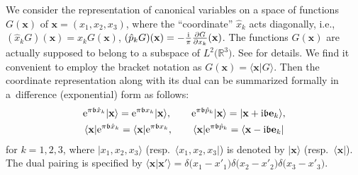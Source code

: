 \documentclass[pdftex]{sigma}
\newcommand{\R}{{\mathbb R}}
\newcommand{\bb}{{\mathfrak b}}
\newcommand{\e}{{\mathrm e}}
\numberwithin{equation}{section}
\begin{document}
We consider the representation of canonical variables on a space of
functions $G(\mathbf{x})$ of $\mathbf{x}=(x_1,x_2,x_3)$, where the
``coordinate'' $\hat{x}_k$ acts diagonally, i.e.,
$(\hat{x}_kG)(\mathbf{x}) = x_k G(\mathbf{x})$,
$(\hat{p}_k G)(\mathbf{x}) = -\frac{\rm i}{\pi}\frac{\partial G}{\partial
 x_k}(\mathbf{x})$. The functions $G(\mathbf{x})$ are actually
supposed to belong to a subspace of $L^2\bigl(\R^3\bigr)$. See \cite[Section~5.2]{FG09b} for details. We find it convenient to employ the bracket
notation as ${G(\mathbf{x}) = \langle \mathbf{x}| G\rangle}$. Then the
coordinate representation along with its dual can be summarized
formally in a~difference (exponential) form as follows:
\begin{gather}
\e^{\pi \bb \hat{x}_k}|\mathbf{x}\rangle = \e^{\pi \bb x_k}|\mathbf{x}\rangle,
\qquad
\e^{\pi \bb \hat{p}_k}|\mathbf{x}\rangle = |\mathbf{x} + {\rm i} \bb \mathbf{e}_k\rangle,\nonumber
\\
\langle \mathbf{x}|\e^{\pi \bb \hat{x}_k} = \langle \mathbf{x}|\e^{\pi \bb x_k},
\qquad
\langle \mathbf{x}|\e^{\pi \bb \hat{p}_k} = \langle \mathbf{x}-{\rm i} \bb \mathbf{e}_k|\label{xrep}
\end{gather}
for $k=1,2,3$, where $|x_1,x_2,x_3\rangle$ (resp.\
$\langle x_1,x_2,x_3|$) is denoted by $|\mathbf{x}\rangle$ (resp.\
$\langle \mathbf{x}|$). The dual pairing is specified by
$\bigl\langle \mathbf{x} | \mathbf{x}'\bigr\rangle =
\delta\bigl(x_1-x'_1\bigr)\delta\bigl(x_2-x'_2\bigr)\delta\bigl(x_3-x'_3\bigr)$.
\end{document}
